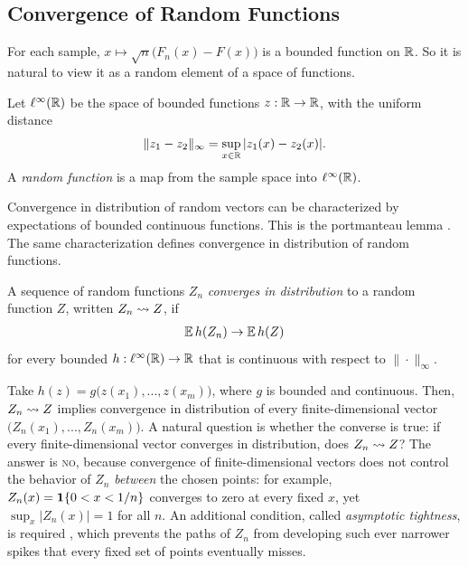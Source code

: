 \documentclass[a4paper,12pt]{article}
\begin{document}
\subsection{Convergence of Random Functions}

For each sample, $x\mapsto\sqrt n\bigl(F_n(x)-F(x)\bigr)$ is a bounded function on $\mathbb{R}$.
So it is natural to view it as a random element of a space of functions.

\begin{definition}
	Let $\ell^\infty(\mathbb{R})$ be the space of bounded functions $z:\mathbb{R}\to\mathbb{R}$, with the uniform distance
	\begin{align}
		\|z_1-z_2\|_\infty=\sup_{x\in\mathbb{R}}|z_1(x)-z_2(x)|.
	\end{align}
	A \emph{random function} is a map from the sample space into $\ell^\infty(\mathbb{R})$.
\end{definition}

\begin{remark}
	Convergence in distribution of random vectors can be characterized by expectations of bounded continuous functions.
	This is the portmanteau lemma \parencite[Lemma 2.2]{van-der-vaart-1998}.
	The same characterization defines convergence in distribution of random functions.
\end{remark}

\begin{definition}
	A sequence of random functions $Z_n$ \emph{converges in distribution} to a random function $Z$, written $Z_n\overset{}{\leadsto} Z$, if
	\begin{align}
		\operatorname{\mathbb{E}} h(Z_n)\to\operatorname{\mathbb{E}} h(Z)
	\end{align}
	for every bounded $h:\ell^\infty(\mathbb{R})\to\mathbb{R}$ that is continuous with respect to $\|\cdot\|_\infty$.
\end{definition}

\begin{remark}\label{rem-weak-convergence}
	Take $h(z)=g\bigl(z(x_1),...,z(x_m)\bigr)$, where $g$ is bounded and continuous.
	Then, $Z_n\overset{}{\leadsto} Z$ implies convergence in distribution of every finite-dimensional vector
	$\bigl(Z_n(x_1),...,Z_n(x_m)\bigr)$.
	A natural question is whether the converse is true: if every finite-dimensional vector converges in distribution, does $Z_n\overset{}{\leadsto} Z$?
	The answer is \textsc{no}, because convergence of finite-dimensional vectors does not control the behavior of $Z_n$ \emph{between} the chosen points:
	for example, $Z_n(x)=\mathbf{1}\{0<x<1/n\}$ converges to zero at every fixed $x$, yet $\sup_x|Z_n(x)|=1$ for all $n$.
	An additional condition, called \emph{asymptotic tightness}, is required \parencite[Theorem 18.14]{van-der-vaart-1998},
	which prevents the paths of $Z_n$ from developing such ever narrower spikes that every fixed set of points eventually misses.
\end{remark}
\end{document}
